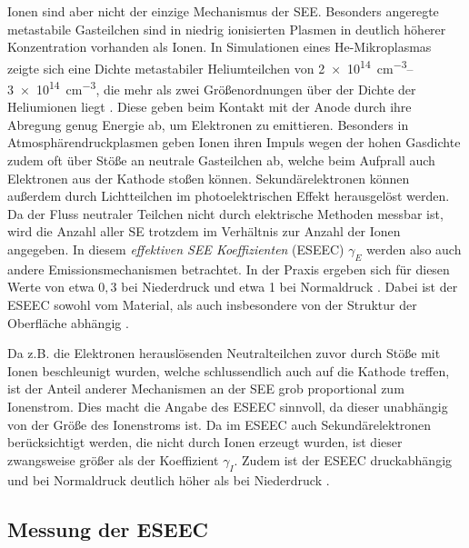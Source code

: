 Ionen sind aber nicht der einzige Mechanismus der SEE. Besonders angeregte metastabile Gasteilchen sind in niedrig ionisierten Plasmen in deutlich höherer Konzentration vorhanden als Ionen. In Simulationen eines He-Mikroplasmas zeigte sich eine Dichte metastabiler Heliumteilchen von \qtyrange{2e14}{3e14}{cm^{-3}}, die mehr als zwei Größenordnungen über der Dichte der Heliumionen liegt \cite{kothnurStructureDirectcurrentMicrodischarge2003}. Diese geben beim Kontakt mit der Anode durch ihre Abregung genug Energie ab, um Elektronen zu emittieren. Besonders in Atmosphärendruckplasmen geben Ionen ihren Impuls wegen der hohen Gasdichte zudem oft über Stöße an neutrale Gasteilchen ab, welche beim Aufprall auch Elektronen aus der Kathode stoßen können. Sekundärelektronen können außerdem durch Lichtteilchen im photoelektrischen Effekt herausgelöst werden. Da der Fluss neutraler Teilchen nicht durch elektrische Methoden messbar ist, wird die Anzahl aller SE trotzdem im Verhältnis zur Anzahl der Ionen angegeben. In diesem \textit{effektiven SEE Koeffizienten} (ESEEC) $ \gamma_E $ werden also auch andere Emissionsmechanismen betrachtet. In der Praxis ergeben sich für diesen Werte von etwa $ 0,\!3 $ bei Niederdruck \cite{arumugamEffectiveSecondaryElectron2017} und etwa 1 bei Normaldruck \cite{hansenConventionalNonconventionalDiagnostics2022}. Dabei ist der ESEEC sowohl vom Material, als auch insbesondere von der Struktur der Oberfläche abhängig \cite{phelpsColdcathodeDischargesBreakdown1999}.


Da z.B. die Elektronen herauslösenden Neutralteilchen zuvor durch Stöße mit Ionen beschleunigt wurden, welche schlussendlich auch auf die Kathode treffen, ist der Anteil anderer Mechanismen an der SEE grob proportional zum Ionenstrom. Dies macht die Angabe des ESEEC sinnvoll, da dieser unabhängig von der Größe des Ionenstroms ist. Da im ESEEC auch Sekundärelektronen berücksichtigt werden, die nicht durch Ionen erzeugt wurden, ist dieser zwangsweise größer als der Koeffizient $ \gamma_I $. Zudem ist der ESEEC druckabhängig und bei Normaldruck deutlich höher als bei Niederdruck \cite{phelpsColdcathodeDischargesBreakdown1999}.

\subsection{Messung der ESEEC}

